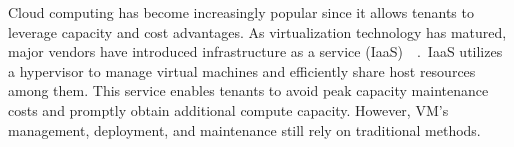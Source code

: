 











Cloud computing has become increasingly popular since it allows tenants to leverage capacity and cost advantages. As virtualization technology has matured, major vendors have introduced infrastructure as a 
service (IaaS)~\cite*{8031522}~\cite*{10.1145/2767181}.~\acrshort{IaaS} utilizes a hypervisor to manage 
virtual machines and efficiently share host resources among them. This service enables tenants to avoid peak capacity maintenance costs and promptly obtain additional compute capacity. However, VM's management, deployment, and maintenance still rely on traditional methods.
 

